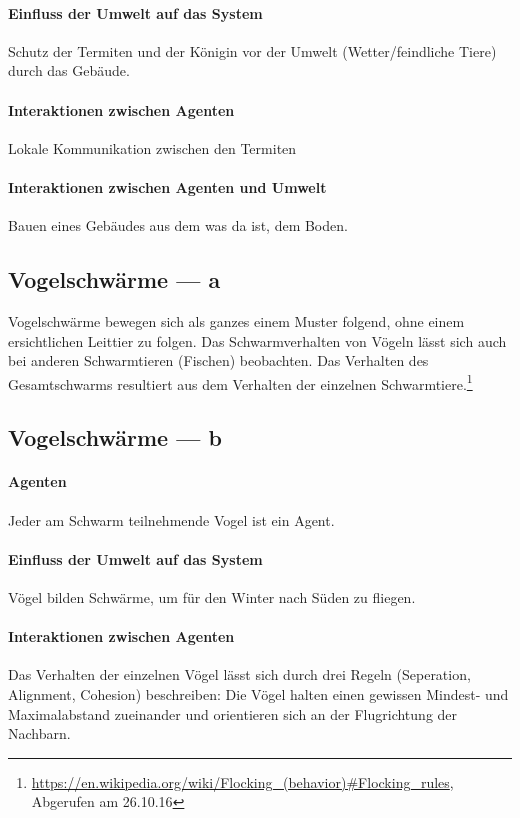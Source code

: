\documentclass[10pt]{article}%
\theoremstyle{nonumberplain}
\begin{document}
\paragraph{Einfluss der Umwelt auf das System}
Schutz der Termiten und der Königin vor der Umwelt (Wetter/feindliche Tiere) durch das Gebäude.
\paragraph{Interaktionen zwischen Agenten}
Lokale Kommunikation zwischen den Termiten
\paragraph{Interaktionen zwischen Agenten und Umwelt}
Bauen eines Gebäudes aus dem was da ist, dem Boden.
\subsection{Vogelschwärme --- a}
Vogelschwärme bewegen sich als ganzes einem Muster folgend, ohne einem ersichtlichen Leittier zu folgen. Das Schwarmverhalten von Vögeln lässt sich auch bei anderen Schwarmtieren (Fischen) beobachten. Das Verhalten des Gesamtschwarms resultiert aus dem Verhalten der einzelnen Schwarmtiere.\footnote{\url{https://en.wikipedia.org/wiki/Flocking_(behavior)#Flocking_rules}, Abgerufen am 26.10.16}
\subsection{Vogelschwärme --- b}
\paragraph{Agenten}
Jeder am Schwarm teilnehmende Vogel ist ein Agent.
\paragraph{Einfluss der Umwelt auf das System}
Vögel bilden Schwärme, um für den Winter nach Süden zu fliegen.

\paragraph{Interaktionen zwischen Agenten}
Das Verhalten der einzelnen Vögel lässt sich durch drei Regeln (Seperation, Alignment, Cohesion) beschreiben: Die Vögel halten einen gewissen Mindest- und Maximalabstand zueinander und orientieren sich an der Flugrichtung der Nachbarn. 
\end{document}

